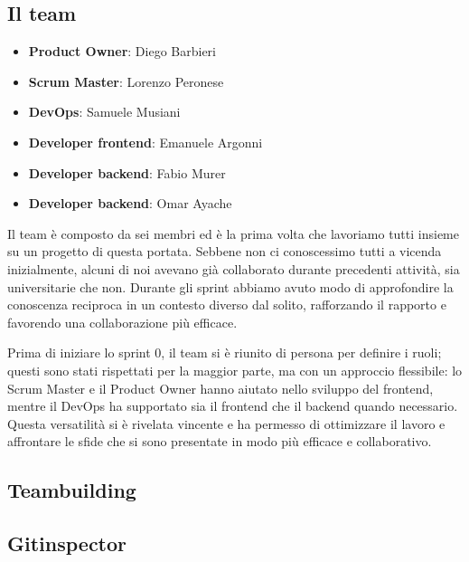 \documentclass{article}
\begin{document}
\subsection{Il team}

\begin{itemize}
    \item \textbf{Product Owner}: Diego Barbieri
    \item \textbf{Scrum Master}: Lorenzo Peronese
    \item \textbf{DevOps}: Samuele Musiani
    \item \textbf{Developer frontend}: Emanuele Argonni
    \item \textbf{Developer backend}: Fabio Murer
    \item \textbf{Developer backend}: Omar Ayache
\end{itemize}

Il team è composto da sei membri ed è la prima volta che lavoriamo tutti insieme su un progetto di questa portata. Sebbene non ci conoscessimo tutti a vicenda inizialmente, 
alcuni di noi avevano già collaborato durante precedenti attività, sia universitarie che non. Durante gli sprint abbiamo avuto modo 
di approfondire la conoscenza reciproca in un contesto diverso dal solito, rafforzando il rapporto e favorendo una collaborazione più efficace. \par
Prima di iniziare lo sprint 0, il team si è riunito di persona per definire i ruoli; questi sono stati rispettati per la maggior parte, ma con un approccio flessibile: 
lo Scrum Master e il Product Owner hanno aiutato nello sviluppo del frontend, mentre il DevOps ha supportato sia il frontend che il backend quando necessario. 
Questa versatilità si è rivelata vincente e ha permesso di ottimizzare il lavoro e affrontare le sfide che si sono presentate in modo più efficace e collaborativo.

\subsection{Teambuilding}

\subsection{Gitinspector}
\end{document}
